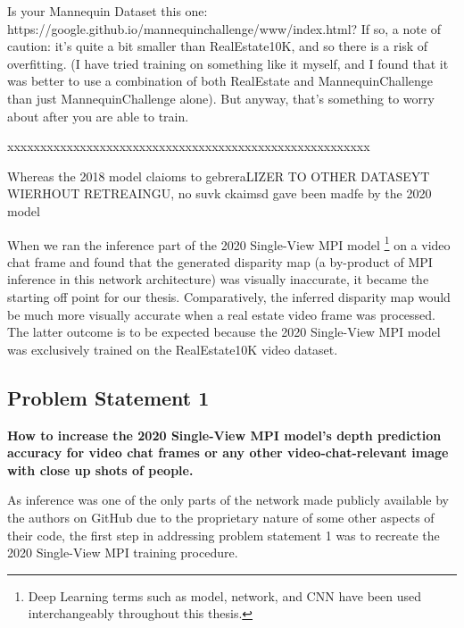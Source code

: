 Is your Mannequin Dataset this one: https://google.github.io/mannequinchallenge/www/index.html? If so, a note of caution: it's quite a bit smaller than RealEstate10K, and so there is a risk of overfitting. (I have tried training on something like it myself, and I found that it was better to use a combination of both RealEstate and MannequinChallenge than just MannequinChallenge alone). But anyway, that's something to worry about after you are able to train.

xxxxxxxxxxxxxxxxxxxxxxxxxxxxxxxxxxxxxxxxxxxxxxxxxxxxxxx

Whereas the 2018 model claioms to gebreraLIZER TO OTHER DATASEYT WIERHOUT RETREAINGU, no suvk ckaimsd gave been madfe by the 2020 model

When we ran the inference part of the 2020 Single-View MPI model \footnote{Deep Learning terms such as model, network, and CNN have been used interchangeably throughout this thesis.} on a video chat frame and found that the generated disparity map (a by-product of MPI inference in this network architecture) was visually inaccurate, it became the starting off point for our thesis. Comparatively, the inferred disparity map would be much more visually accurate when a real estate video frame was processed. The latter outcome is to be expected because the 2020 Single-View MPI model was exclusively trained on the RealEstate10K video dataset.   

\subsection{Problem Statement 1}\label{subsec1:problem_statement_1}

\textbf{How to increase the 2020 Single-View MPI model’s depth prediction accuracy for video chat frames or any other video-chat-relevant image with close up shots of people.}

As inference was one of the only parts of the network made publicly available by the authors on GitHub due to the proprietary nature of some other aspects of their code, the first step in addressing problem statement 1 was to recreate the 2020 Single-View MPI training procedure.

